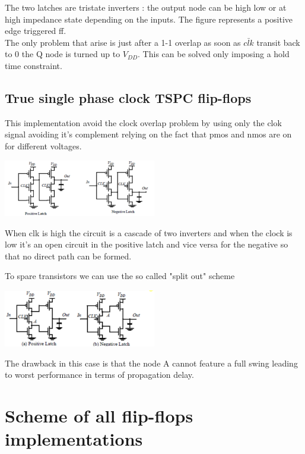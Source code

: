 The two latches are tristate inverters : the output node can be high low or at high impedance state depending on the inputs. The figure represents a positive edge triggered ff.\\
The only problem that arise is just after a 1-1 overlap as soon as $\bar{clk}$ transit back to 0 the Q node is turned up to $V_{DD}$. This can be solved only imposing a hold time constraint.\\


\subsection{True single phase clock TSPC flip-flops}
This implementation avoid the clock overlap problem by using only the clok signal avoiding it's complement relying on the fact that pmos and nmos are on for different voltages.

\centering
\includegraphics[width=0.5\textwidth]{C10_17.png}\\
\raggedright

When clk is high the circuit is a cascade of two inverters and when the clock is low it's an open circuit in the positive latch and vice versa for the negative so that no direct path can be formed.\\
\vspace{5mm}


To spare transistors we can use the so called "split out" scheme 

\centering
\includegraphics[width=0.5\textwidth]{C10_18.png}\\
\raggedright

The drawback in this case is that the node A cannot feature a full swing leading to worst performance in terms of propagation delay.\\



\section{Scheme of all flip-flops implementations}


